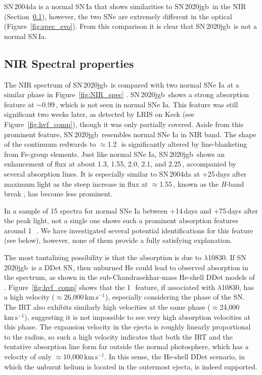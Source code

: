 \documentclass[twocolumn]{aastex631}
\newcommand{\sn}{SN\,2020jgb}
\newcommand{\kms}{$\mathrm{km}\,\mathrm{s}^{-1}$}
\begin{document}
SN\,2004da is a normal SN\,Ia that shows similarities to \sn\ in the NIR (Section~\ref{sec:NIR_spec}), however, the two SNe are extremely different in the optical (Figure~\ref{fig:spec_evo}). From this comparison it is clear that \sn\ is not a normal SN\,Ia. 

\subsection{NIR Spectral properties}
\label{sec:NIR_spec}
The NIR spectrum of \sn\ is compared with two normal SNe Ia at a similar phase in Figure~\ref{fig:NIR_spec} \citep[data for SNe\,2004ab and 2004da from][]{Marion2009_NIR}. \sn\ shows a strong absorption feature at $\sim$0.99\,\micron, which is not seen in normal SNe Ia. This feature was still significant two weeks later, as detected by LRIS on Keck (see Figure~\ref{fig:hvf_comp}), though it was only partially covered. Aside from this prominent feature, \sn\ resembles normal SNe Ia in NIR band. The shape of the continuum redwards to $\approx$1.2\,\micron\ is significantly altered by line-blanketing from Fe-group elements. Just like normal SNe Ia, \sn\ shows an enhancement of flux at about 1.3, 1.55, 2.0, 2.1, and 2.25\,\micron, accompanied by several  absorption lines. It is especially similar to SN\,2004da at +25\,days after maximum light as the steep increase in flux at $\approx$1.55\,\micron, known as the \textit{H}-band break \citep{Hsiao_CSP_2019}, has become less prominent.

In a sample of 15 spectra for normal SNe Ia between +14\,days and +75\,days after the peak light, not a single one shows such a prominent absorption features around 1\,\micron\ \citet{Marion2009_NIR}. We have investigated several potential identifications for this feature (see below), however, none of them provide a fully satisfying explanation.

The most tantalizing possibility is that the absorption is due to  $\lambda$10830. If \sn\ is a DDet SN, then unburned He could lead to observed absorption in the spectrum, as shown in the sub-Chandrasekhar-mass He-shell DDet models of \citet{Boyle2017_Helium}. Figure~\ref{fig:hvf_comp} shows that the 1\,\micron\ feature, if associated with  $\lambda$10830, has a high velocity ($\approx$26,000\,\kms), especially considering the phase of the SN. The  IRT also exhibits similarly high velocities at the same phase ($\approx$24,000\,\kms), suggesting it is not impossible to see very high absorption velocities at this phase. The expansion velocity in the ejecta is roughly linearly proportional to the radius, so such a high velocity indicates that both the  IRT and the tentative  absorption line form far outside the normal photosphere, which has a velocity of only $\approx$10,000\,\kms. In this sense, the He-shell DDet scenario, in which the unburnt helium is located in the outermost ejecta, is indeed supported.
\end{document}
